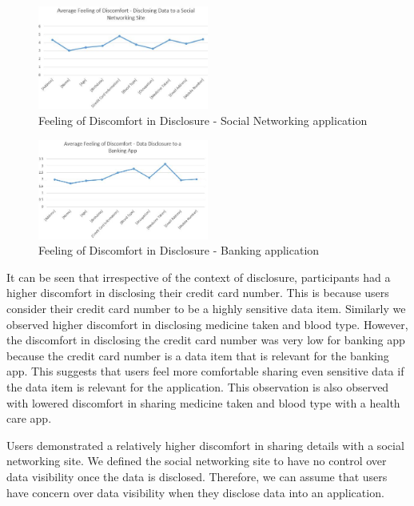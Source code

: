 \documentclass[conference]{IEEEtran}
\begin{document}
\begin{figure}[h]
\begin{center}
\includegraphics[width=0.5\textwidth]{Average_SocialNetworking}
\caption{Feeling of Discomfort in Disclosure - Social Networking application}
\end{center}
\end{figure}

\begin{figure}[h]
\begin{center}
\includegraphics[width=0.5\textwidth]{Average_Banking}
\caption{Feeling of Discomfort in Disclosure - Banking application}
\end{center}
\end{figure}

It can be seen that irrespective of the context of disclosure, participants had a higher discomfort in disclosing their credit card number. This is because users consider their credit card number to be a highly sensitive data item.  Similarly we observed higher discomfort in disclosing medicine taken and blood type. However, the discomfort in disclosing the credit card number was very low for banking app because the credit card number is a data item that is relevant for the banking app. This suggests that users feel more comfortable sharing even sensitive data if the data item is relevant for the application. This observation is also observed with lowered discomfort in sharing medicine taken and blood type with a health care app.

Users demonstrated a relatively higher discomfort in sharing details with a social networking site. We defined the social networking site to have no control over data visibility once the data is disclosed. Therefore, we can assume that users have concern over data visibility when they disclose data into an application. 
\end{document}
